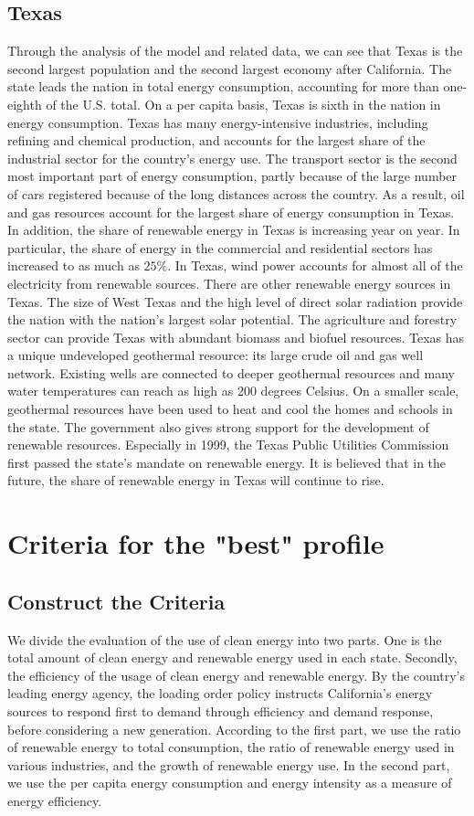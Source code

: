 \documentclass{mcmthesis}
\begin{document}
\subsection{Texas}
Through the analysis of the model and related data, we can see that Texas is the second largest population and the second largest economy after California.
The state leads the nation in total energy consumption, accounting for more than one-eighth of the U.S. total.
On a per capita basis, Texas is sixth in the nation in energy consumption.
Texas has many energy-intensive industries, including refining and chemical production, and accounts for the largest share of the industrial sector for the country's energy use.
The transport sector is the second most important part of energy consumption, partly because of the large number of cars registered because of the long distances across the country.
As a result, oil and gas resources account for the largest share of energy consumption in Texas. In addition, the share of renewable energy in Texas is increasing year on year.
In particular, the share of energy in the commercial and residential sectors has increased to as much as $25\%$.
In Texas, wind power accounts for almost all of the electricity from renewable sources. There are other renewable energy sources in Texas.
The size of West Texas and the high level of direct solar radiation provide the nation with the nation's largest solar potential.
The agriculture and forestry sector can provide Texas with abundant biomass and biofuel resources.
Texas has a unique undeveloped geothermal resource: its large crude oil and gas well network.
Existing wells are connected to deeper geothermal resources and many water temperatures can reach as high as 200 degrees Celsius.
On a smaller scale, geothermal resources have been used to heat and cool the homes and schools in the state.
The government also gives strong support for the development of renewable resources.
Especially in 1999, the Texas Public Utilities Commission first passed the state's mandate on renewable energy.
It is believed that in the future, the share of renewable energy in Texas will continue to rise.

\section{Criteria for the "best" profile}
\subsection{Construct the Criteria}
We divide the evaluation of the use of clean energy into two parts.
One is the total amount of clean energy and renewable energy used in each state.
Secondly, the efficiency of the usage of clean energy and renewable energy.
By the country's leading energy agency, the loading order policy instructs California's energy sources to respond first to demand through efficiency and demand response,
before considering a new generation.
According to the first part, we use the ratio of renewable energy to total consumption, the ratio of renewable energy used in various industries,
and the growth of renewable energy use. In the second part, we use the per capita energy consumption and energy intensity as a measure of energy efficiency.
\end{document}
